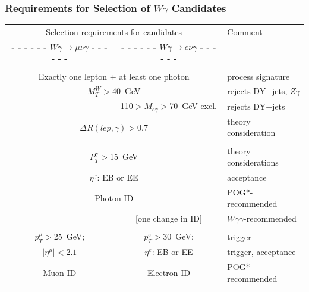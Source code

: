 \begin{frame}\frametitle{Requirements for Selection of $W\gamma$ Candidates}
  \begin{table}[h]
     \tiny
     \begin{center}
     \begin{tabular}{|c|c|l|}
     \hline
     \multicolumn{2}{|c|}{\scriptsize{Selection requirements for candidates}} & {\scriptsize{Comment}} \\ 
     {\bfseries{- - - - - - $W\gamma\rightarrow\mu\nu\gamma$ - - - - - -}} & 
     {\bfseries{- - - - - - $W\gamma\rightarrow e\nu\gamma$ - - - - - -}}  & \\ \hline

    \multicolumn{2}{|c|}{\scriptsize\bfseries\color{blue}{Event level:}}  & \\ 
     \multicolumn{2}{|c|}{Exactly one lepton + at least one photon}  & process signature\\  
      \multicolumn{2}{|c|}{$M_T^W>$40~GeV} & rejects DY+jets, $Z\gamma$\\ 
                                & 110$>M_{e\gamma}>$70~GeV excl. & rejects DY+jets\\ 
      \multicolumn{2}{|c|}{$\Delta{R}(lep,\gamma)>$0.7} & theory consideration\\  \hline

     \multicolumn{2}{|c|}{\scriptsize\bfseries\color{blue}{Photon selection:}} & \\
     \multicolumn{2}{|c|}{\tiny{$P_T^{\gamma}>$15~GeV}} & theory considerations \\ 
     \multicolumn{2}{|c|}{\tiny{$\eta^{\gamma}$: EB or EE}} & acceptance \\ 
     \multicolumn{2}{|c|}{\tiny{Photon ID}} & POG*-recommended \\ 
             &{\tiny{ [one change in ID]}} & $W\gamma\gamma$-recommended\\ \hline

     \multicolumn{2}{|c|}{\scriptsize\bfseries\color{blue}{Lepton selection:}} & \\
      \tiny{$p_T^{\mu}>$25~GeV;} &  \tiny{$p_T^{e}>$30~GeV;}  & trigger\\ 
      \tiny{$|\eta^{\mu}|<2.1$} & \tiny{  $\eta^{e}$: EB or EE} & trigger, acceptance\\ 
      Muon ID & Electron ID & POG*-recommended \\ \hline


\end{tabular}
\end{center}
\end{table}
\end{frame}
